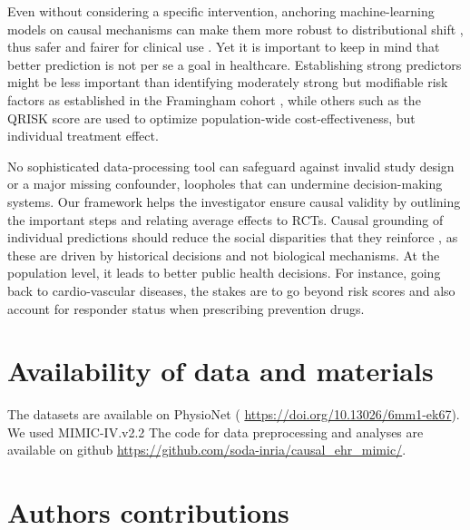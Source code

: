 \documentclass[10pt,letterpaper]{article}
\begin{document}
Even without considering a specific intervention, anchoring
machine-learning models on
causal mechanisms can make them more robust to distributional shift \cite{scholkopf2021toward},
thus safer and fairer for clinical use
\cite{richens2020improving,plecko2022causal}.
%
Yet it is important to keep in mind that better prediction is not per se
a goal in healthcare.
%
Establishing strong predictors might be less important than identifying
moderately strong but modifiable risk factors as established in the Framingham
cohort \cite{brand1976multivariate}, while others such as the QRISK score are used to optimize population-wide cost-effectiveness, but individual treatment effect.

No sophisticated data-processing tool can safeguard against
invalid study design or a major missing confounder, loopholes that can
undermine decision-making systems. Our framework helps the investigator
ensure
causal validity by outlining the important steps and relating average effects to
RCTs. Causal grounding of individual predictions should reduce the social
disparities that they reinforce
\cite{rajkomar2018ensuring,mitra2022future,ehrmann2023making}, as these are driven by
historical decisions and not biological mechanisms. At the population
level, it leads to better public health decisions. For instance, going
back to cardio-vascular diseases, the stakes are to go beyond risk
scores and also account for responder status when prescribing prevention
drugs.


\section*{Availability of data and materials}

The datasets are available on PhysioNet (
\url{https://doi.org/10.13026/6mm1-ek67}). We used MIMIC-IV.v2.2 The code for
data preprocessing and analyses are available on github
\url{https://github.com/soda-inria/causal_ehr_mimic/}.


\section*{Authors contributions}
\end{document}
